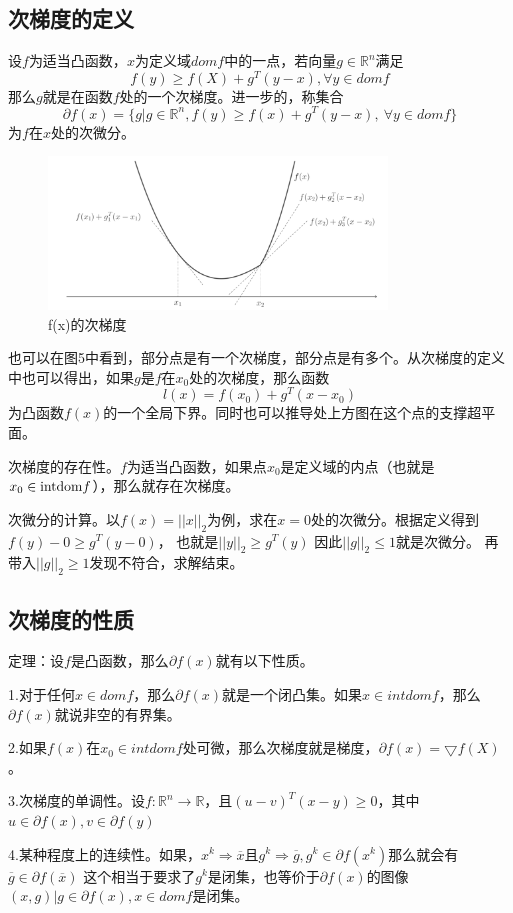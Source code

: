 \documentclass{article}
\begin{document}
\subsection{次梯度的定义}
设$f$为适当凸函数，$x$为定义域$dom f$中的一点，若向量$g \in \mathbb{R}^n$满足
$$f(y) \ge f(X)+g^T(y-x) ,\forall y \in domf$$
那么$g$就是在函数$f$处的一个次梯度。进一步的，称集合$$\partial f(x) =\{g|g \in \mathbb{R}^n,f(y) \ge f(x)+g^T(y-x), \ \forall y \in domf\}$$为$f$在$x$处的次微分。
\begin{figure}
    \centering
    \includegraphics[width=9cm]{7.png}
    \caption{f(x)的次梯度}
\end{figure}
也可以在图5中看到，部分点是有一个次梯度，部分点是有多个。从次梯度的定义中也可以得出，如果$g$是$f$在$x_0$处的次梯度，那么函数$$l(x)=f(x_0)+g^T(x-x_0)$$为凸函数$f(x)$的一个全局下界。同时也可以推导处上方图在这个点的支撑超平面。

次梯度的存在性。$f$为适当凸函数，如果点$x_0$是定义域的内点（也就是$x_0 \in {\rm intdom} f$），那么就存在次梯度。

次微分的计算。以$f(x)=||x||_2$为例，求在$x=0$处的次微分。根据定义得到
$f(y)-0 \ge g^T(y-0)$，
也就是$||y||_2 \ge g^T(y)$
因此$||g||_2 \le 1$就是次微分。
再带入$||g||_2 \ge 1$发现不符合，求解结束。

\subsection{次梯度的性质}
定理：设$f$是凸函数，那么$\partial f(x)$就有以下性质。

1.对于任何$x \in domf$，那么$\partial f(x)$就是一个闭凸集。如果$x \in intdomf$，那么$\partial f(x)$就说非空的有界集。

2.如果$f(x)$在$x_0 \in intdomf$处可微，那么次梯度就是梯度，$\partial f(x)=\bigtriangledown f(X)$。

3.次梯度的单调性。设$f: \mathbb{R}^n \rightarrow \mathbb{R}$，且$(u-v)^T(x-y) \ge 0$，其中$u \in \partial f(x),v \in \partial f(y)$

4.某种程度上的连续性。如果，$x^k \Rightarrow \overline{x}$且$g^k \Rightarrow \overline{g},g^k \in \partial f(x^k)$那么就会有$\overline{g} \in \partial f(\overline{x})$
这个相当于要求了$g^k$是闭集，也等价于$\partial f(x)$的图像${(x,g)|g \in \partial f(x),x \in domf}$是闭集。
\end{document}
